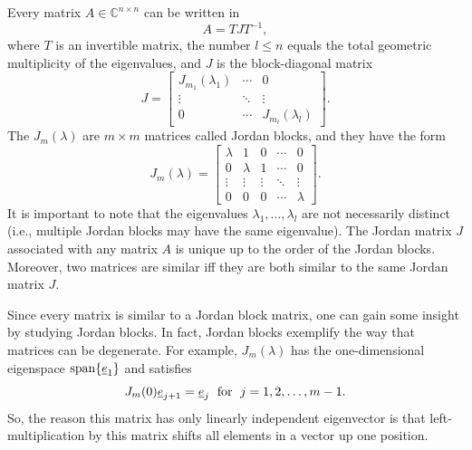 \begin{definition}
Every matrix $A\in\mathbb C^{n\times n}$ can be written in 
\begin{equation*}
A = T J T^{-1} ,
\end{equation*}
where $T$ is an invertible matrix, the number $l\leq n$ equals the total geometric multiplicity of the eigenvalues, and $J$ is the block-diagonal matrix
\begin{equation*}
J = \begin{bmatrix}
J_{m_1}(\lambda_1) & \cdots & 0 \\
\vdots & \ddots & \vdots \\
0 & \cdots & J_{m_l}(\lambda_l)
\end{bmatrix} .
\end{equation*}
The $J_m (\lambda)$ are $m\times m$ matrices called Jordan blocks, and they have the form
\begin{equation*}
J_m (\lambda) = \begin{bmatrix}
\lambda & 1 & 0 &\cdots & 0 \\
0 & \lambda & 1 & \cdots & 0 \\
\vdots & \vdots & \vdots & \ddots & \vdots \\
0 & 0 & 0 & \cdots & \lambda
\end{bmatrix} .
\end{equation*}
It is important to note that the eigenvalues $\lambda_1, \ldots, \lambda_l$ are not necessarily distinct (i.e., multiple Jordan blocks may have the same eigenvalue).
The Jordan matrix $J$ associated with any matrix $A$ is unique up to the order of the Jordan blocks.
Moreover, two matrices are similar iff they are both similar to the same Jordan matrix $J$.
\end{definition}


Since every matrix is similar to a Jordan block matrix, one can gain some insight by studying Jordan blocks.
In fact, Jordan blocks exemplify the way that matrices can be degenerate.
For example, $J_m (\lambda)$ has the one-dimensional eigenspace $\operatorname{span}\{\underline e_1\}$ and satisfies
\[ J_m (0) \underline{e}_{j+1} = \underline{e}_j \; \textrm{ for } \; j=1,2,\ldots,m-1. \]
So, the reason this matrix has only linearly independent eigenvector is that left-multiplication by this matrix shifts all elements in a vector up one position.

